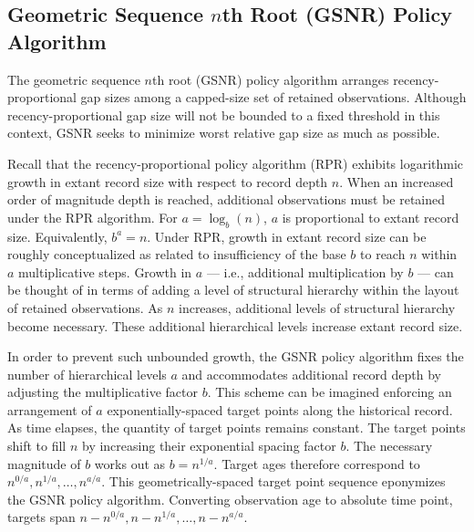 \subsection{Geometric Sequence $n$th Root (GSNR) Policy Algorithm}
\label{sec:geom-seq-nth-root-algo}

The geometric sequence $n$th root (GSNR) policy algorithm arranges recency-proportional gap sizes among a capped-size set of retained observations.
Although recency-proportional gap size will not be bounded to a fixed threshold in this context, GSNR seeks to minimize worst relative gap size as much as possible.

Recall that the recency-proportional policy algorithm (RPR) exhibits logarithmic growth in extant record size with respect to record depth $n$.
When an increased order of magnitude depth is reached, additional observations must be retained under the RPR algorithm.
For $a = \log_b(n)$, $a$ is proportional to extant record size.
Equivalently, $b^a = n$.
Under RPR, growth in extant record size can be roughly conceptualized as related to insufficiency of the base $b$ to reach $n$ within $a$ multiplicative steps.
Growth in $a$ --- i.e., additional multiplication by $b$ --- can be thought of in terms of adding a level of structural hierarchy within the layout of retained observations.
As $n$ increases, additional levels of structural hierarchy become necessary.
These additional hierarchical levels increase extant record size.

In order to prevent such unbounded growth, the GSNR policy algorithm fixes the number of hierarchical levels $a$ and accommodates additional record depth by adjusting the multiplicative factor $b$.
This scheme can be imagined enforcing an arrangement of $a$ exponentially-spaced target points along the historical record.
As time elapses, the quantity of target points remains constant.
The target points shift to fill $n$ by increasing their exponential spacing factor $b$.
The necessary magnitude of $b$ works out as $b = n^{1/a}$.
Target ages therefore correspond to $n^{0/a}, n^{1/a}, \ldots, n^{a/a}$.
This geometrically-spaced target point sequence eponymizes the GSNR policy algorithm.
Converting observation age to absolute time point, targets span $n - n^{0/a}, n - n^{1/a}, \ldots, n - n^{a/a}$.

